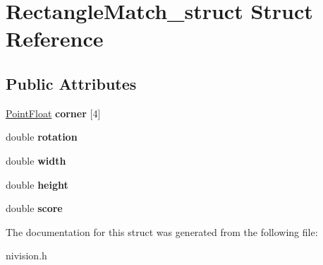 \hypertarget{structRectangleMatch__struct}{\section{\-Rectangle\-Match\-\_\-struct \-Struct \-Reference}
\label{structRectangleMatch__struct}
}
\subsection*{\-Public \-Attributes}
\begin{DoxyCompactItemize}
\item 
\hypertarget{structRectangleMatch__struct_a2660d504e9b45c3d09eda7be91780fc0}{\hyperlink{structPointFloat__struct}{\-Point\-Float} {\bfseries corner} \mbox{[}4\mbox{]}}\label{structRectangleMatch__struct_a2660d504e9b45c3d09eda7be91780fc0}

\item 
\hypertarget{structRectangleMatch__struct_a5ef0ebf81b02ef1526378fac30749991}{double {\bfseries rotation}}\label{structRectangleMatch__struct_a5ef0ebf81b02ef1526378fac30749991}

\item 
\hypertarget{structRectangleMatch__struct_a35ee8f90cb6865c288dc3da085033b64}{double {\bfseries width}}\label{structRectangleMatch__struct_a35ee8f90cb6865c288dc3da085033b64}

\item 
\hypertarget{structRectangleMatch__struct_ae298715668834a5e4ab263f388b2b092}{double {\bfseries height}}\label{structRectangleMatch__struct_ae298715668834a5e4ab263f388b2b092}

\item 
\hypertarget{structRectangleMatch__struct_adecbd636149bc69329d413b0ff5a0cb4}{double {\bfseries score}}\label{structRectangleMatch__struct_adecbd636149bc69329d413b0ff5a0cb4}

\end{DoxyCompactItemize}


\-The documentation for this struct was generated from the following file\-:\begin{DoxyCompactItemize}
\item 
nivision.\-h\end{DoxyCompactItemize}
